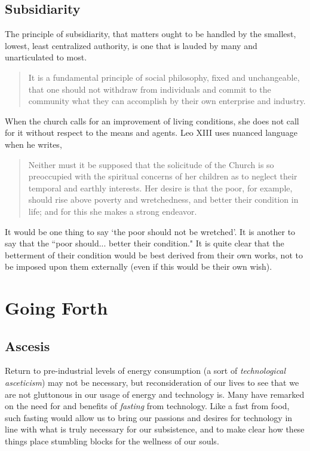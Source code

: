\documentclass[letterpaper]{article}
\begin{document}
\subsection{Subsidiarity}

The principle of subsidiarity, that matters ought to be handled by the smallest, lowest, least centralized authority, is one that is lauded by many and unarticulated to most.

\begin{quote}
  It is a fundamental principle of social philosophy, fixed and unchangeable, that one should not withdraw from individuals and commit to the community what they can accomplish by their own enterprise and industry.
\end{quote}

When the church calls for an improvement of living conditions, she does not call for it without respect to the means and agents. Leo XIII uses nuanced language when he writes,

\begin{quote}
  Neither must it be supposed that the solicitude of the Church is so preoccupied with the spiritual concerns of her children as to neglect their temporal and earthly interests. Her desire is that the poor, for example, should rise above poverty and wretchedness, and better their condition in life; and for this she makes a strong endeavor.
\end{quote}

It would be one thing to say `the poor should not be wretched'. It is another to say that the ``poor should... better their condition."  It is quite clear that the betterment of their condition would be best derived from their own works, not to be imposed upon them externally (even if this would be their own wish).



\section{Going Forth}




\iffalse
\subsection{Ascesis}

Return to pre-industrial levels of energy consumption (a sort of \textit{technological asceticism}) may not be necessary, but reconsideration of our lives to see that we are not gluttonous in our usage of energy and technology is. Many have remarked on the need for and benefits of \textit{fasting} from technology. Like a fast from food, such fasting would allow us to bring our passions and desires for technology in line with what is truly necessary for our subsistence, and to make clear how these things place stumbling blocks for the wellness of our souls. 
\end{document}
